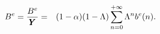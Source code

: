 \begin{eqnarray}
B^{e} = \frac{B^{e}}{\pmb{Y}} & = & (1-\alpha) (1-\Lambda)\sum_{n=0}^{+\infty}\Lambda^{n} b^{e}(n).
\label{eq:BRatENostake}
\end{eqnarray}

